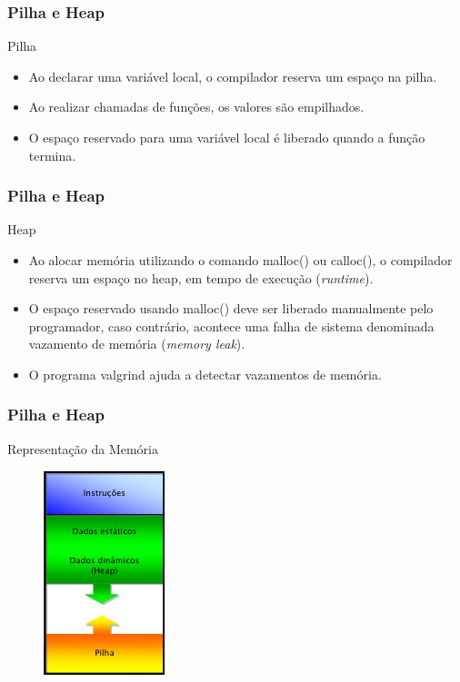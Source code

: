 \documentclass[aspectratio=169]{beamer}
\begin{document}

\begin{frame}
\frametitle{Pilha e Heap}
Pilha
\begin{itemize}
\item Ao declarar uma variável local, o compilador reserva um espaço na pilha.
\item Ao realizar chamadas de funções, os valores são empilhados.
\item O espaço reservado para uma variável local é liberado quando a função termina.
\end{itemize}
\end{frame}


\begin{frame}
\frametitle{Pilha e Heap}
Heap
\begin{itemize}
\item Ao alocar memória utilizando o comando malloc() ou calloc(), o compilador reserva um espaço no heap, em tempo de execução ({\it runtime}).
\item O espaço reservado usando malloc() deve ser liberado manualmente pelo programador, caso contrário, acontece uma falha de sistema denominada vazamento de memória ({\it memory leak}).
\item O programa valgrind ajuda a detectar vazamentos de memória.
\end{itemize}
\end{frame}


\begin{frame}
\frametitle{Pilha e Heap}
Representação da Memória
\begin{figure}[!ht]
  \centering
  \includegraphics[width=100pt]{imgs/memoria.jpg}
\end{figure}
\end{frame}
\end{document}
